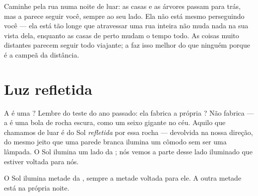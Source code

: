 \begin{example}\label{ex:g2:moon-in-the-sky:follows}
Caminhe pela rua numa noite de luar: as casas e as árvores passam
para trás, mas a  parece seguir você, sempre ao seu lado. Ela não
está mesmo perseguindo você --- ela está tão longe que atravessar uma
rua inteira não muda nada na sua vista dela, enquanto as casas de
perto mudam o tempo todo. As coisas muito distantes parecem seguir
todo viajante; a  faz isso melhor do que ninguém porque é a
campeã da distância.
\end{example}

\section{Luz refletida}

\begin{example}\label{ex:g2:moon-in-the-sky:borrowed}
A  é uma ? Lembre do teste do ano passado: ela fabrica
a própria ? Não fabrica --- a  é uma bola de rocha escura, como
um seixo gigante no céu. Aquilo que chamamos de luar é  do Sol
\emph{refletida} por essa rocha --- devolvida na nossa direção, do
mesmo jeito que uma parede branca ilumina um cômodo sem ser uma
lâmpada. O Sol ilumina um lado da ; nós vemos a parte desse lado
iluminado que estiver voltada para nós.
\end{example}

\begin{omfigure}

{\small O Sol ilumina metade da , sempre a metade voltada para
ele. A outra metade está na própria noite.}
\end{omfigure}

